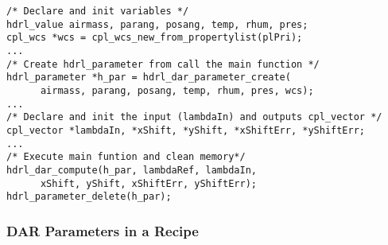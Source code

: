 \begin{lstlisting}
/* Declare and init variables */
hdrl_value airmass, parang, posang, temp, rhum, pres;
cpl_wcs *wcs = cpl_wcs_new_from_propertylist(plPri);
...
/* Create hdrl_parameter from call the main function */
hdrl_parameter *h_par = hdrl_dar_parameter_create(
      airmass, parang, posang, temp, rhum, pres, wcs);
...
/* Declare and init the input (lambdaIn) and outputs cpl_vector */
cpl_vector *lambdaIn, *xShift, *yShift, *xShiftErr, *yShiftErr;
...
/* Execute main funtion and clean memory*/
hdrl_dar_compute(h_par, lambdaRef, lambdaIn,
      xShift, yShift, xShiftErr, yShiftErr);
hdrl_parameter_delete(h_par);
\end{lstlisting}


\subsubsection{DAR Parameters in a Recipe}
\label{sec:algorithms:refraction:parameters}

